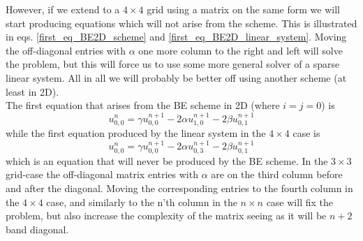 However, if we extend to a $4\times4$ grid using a matrix on the same form we will start producing equations which will not arise from the scheme. 
This is illustrated in eqs. \ref{first_eq_BE2D_scheme} and \ref{first_eq_BE2D_linear_system}. 
Moving the off-diagonal entries with $\alpha$ one more column to the right and left will solve the problem, but this will force us to use some more general solver of a sparse linear system. 
All in all we will probably be better off using another scheme (at least in 2D).\\
The first equation that arises from the BE scheme in 2D (where $i=j=0$) is
\begin{equation}\label{first_eq_BE2D_scheme}
 u^n_{0,0} = \gamma u^{n+1}_{0,0}-2\alpha u^{n+1}_{1,0} -2\beta u^{n+1}_{0,1}
\end{equation}
while the first equation produced by the linear system in the $4\times4$ case is 
\begin{equation}\label{first_eq_BE2D_linear_system}
 u^n_{0,0} = \gamma u^{n+1}_{0,0}-2\alpha u^{n+1}_{0,3} -2\beta u^{n+1}_{0,1}
\end{equation}
which is an equation that will never be produced by the BE scheme. 
In the $3\times3$ grid-case the off-diagonal matrix entries with $\alpha$ are on the third column before and after the diagonal. 
Moving the corresponding entries to the fourth column in the $4\times4$ case, and similarly to the n'th column in the $n\times n$ case will fix the problem, but also increase the complexity of the matrix seeing as it will be $n+2$ band diagonal.